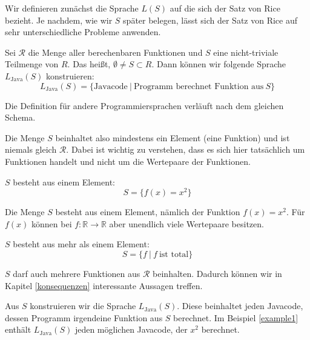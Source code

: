 \documentclass[journal]{IEEEtran}
\begin{document}
Wir definieren zunächst die Sprache $L(S)$ auf die sich der Satz von Rice bezieht. Je nachdem, wie wir $S$ später belegen, lässt sich der Satz von Rice auf sehr unterschiedliche Probleme anwenden.

\begin{definition}
\label{defls}
Sei $\mathcal{R}$ die Menge aller berechenbaren Funktionen und $S$ eine nicht-triviale Teilmenge von $R$. Das heißt, $\emptyset \ne S \subset R$. Dann können wir folgende Sprache $L_\text{Java}(S)$ konstruieren:
\begin{equation*}
L_\text{Java}(S) = \{ \text{Javacode} \ \vert \ \text{Programm berechnet Funktion aus} \ S \}
\end{equation*}
\end{definition}

Die Definition für andere Programmiersprachen verläuft nach dem gleichen Schema.

Die Menge $S$ beinhaltet also mindestens ein Element (eine Funktion) und ist niemals gleich $\mathcal{R}$. Dabei ist wichtig zu verstehen, dass es sich hier tatsächlich um Funktionen handelt und nicht um die Wertepaare der Funktionen.

\begin{example}
\label{example1}
$S$ besteht aus einem Element:
\begin{equation*}
  S = \{ f(x) = x^2 \}
\end{equation*}
\end{example}

Die Menge $S$ besteht aus einem Element, nämlich der Funktion $f(x) = x^2$. Für $f(x)$ können bei $f\colon \mathbb{R} \to \mathbb{R}$ aber unendlich viele Wertepaare besitzen.

\begin{example}
\label{example2}
$S$ besteht aus mehr als einem Element:
\begin{equation*}
  S = \{f \ \vert \ f \ \text{ist total}\}
\end{equation*}
\end{example}

$S$ darf auch mehrere Funktionen aus $\mathcal{R}$ beinhalten. Dadurch können wir in Kapitel \ref{konsequenzen} interessante Aussagen treffen.

Aus $S$ konstruieren wir die Sprache $L_\text{Java}(S)$. Diese beinhaltet jeden Javacode, dessen Programm irgendeine Funktion aus $S$ berechnet. Im Beispiel \ref{example1} enthält $L_\text{Java}(S)$ jeden möglichen Javacode, der $x^2$ berechnet.
\end{document}

